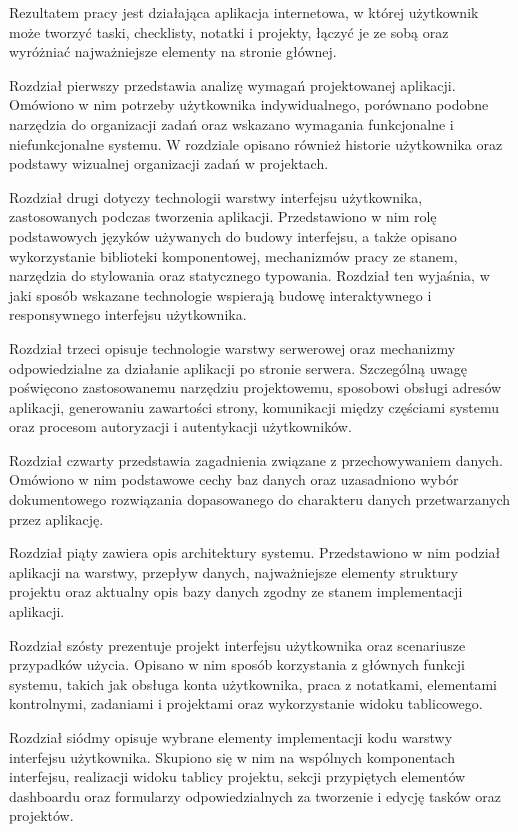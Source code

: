 \documentclass[12pt,a4paper,twoside]{report}
\begin{document}
Rezultatem pracy jest działająca aplikacja internetowa, w której użytkownik może tworzyć taski, checklisty, notatki i projekty, łączyć je ze sobą oraz wyróżniać najważniejsze elementy na stronie głównej.

Rozdział pierwszy przedstawia analizę wymagań projektowanej aplikacji. Omówiono w nim potrzeby użytkownika indywidualnego, porównano podobne narzędzia do organizacji zadań oraz wskazano wymagania funkcjonalne i niefunkcjonalne systemu. W rozdziale opisano również historie użytkownika oraz podstawy wizualnej organizacji zadań w projektach.

Rozdział drugi dotyczy technologii warstwy interfejsu użytkownika, zastosowanych podczas tworzenia aplikacji. Przedstawiono w nim rolę podstawowych języków używanych do budowy interfejsu, a także opisano wykorzystanie biblioteki komponentowej, mechanizmów pracy ze stanem, narzędzia do stylowania oraz statycznego typowania. Rozdział ten wyjaśnia, w jaki sposób wskazane technologie wspierają budowę interaktywnego i responsywnego interfejsu użytkownika.

Rozdział trzeci opisuje technologie warstwy serwerowej oraz mechanizmy odpowiedzialne za działanie aplikacji po stronie serwera. Szczególną uwagę poświęcono zastosowanemu narzędziu projektowemu, sposobowi obsługi adresów aplikacji, generowaniu zawartości strony, komunikacji między częściami systemu oraz procesom autoryzacji i autentykacji użytkowników.

Rozdział czwarty przedstawia zagadnienia związane z przechowywaniem danych. Omówiono w nim podstawowe cechy baz danych oraz uzasadniono wybór dokumentowego rozwiązania dopasowanego do charakteru danych przetwarzanych przez aplikację.

Rozdział piąty zawiera opis architektury systemu. Przedstawiono w nim podział aplikacji na warstwy, przepływ danych, najważniejsze elementy struktury projektu oraz aktualny opis bazy danych zgodny ze stanem implementacji aplikacji.

Rozdział szósty prezentuje projekt interfejsu użytkownika oraz scenariusze przypadków użycia. Opisano w nim sposób korzystania z głównych funkcji systemu, takich jak obsługa konta użytkownika, praca z notatkami, elementami kontrolnymi, zadaniami i projektami oraz wykorzystanie widoku tablicowego.

Rozdział siódmy opisuje wybrane elementy implementacji kodu warstwy interfejsu użytkownika. Skupiono się w nim na wspólnych komponentach interfejsu, realizacji widoku tablicy projektu, sekcji przypiętych elementów dashboardu oraz formularzy odpowiedzialnych za tworzenie i edycję tasków oraz projektów.
\end{document}
